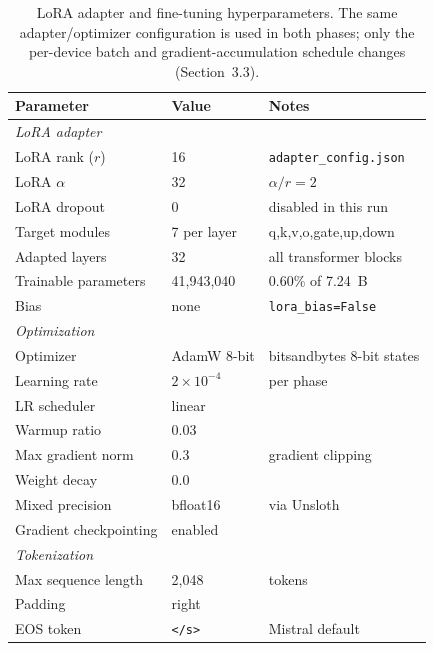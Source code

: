 \documentclass[11pt, a4paper]{article}
\begin{document}
\begin{table}[H]
\centering
\caption{LoRA adapter and fine-tuning hyperparameters. The same adapter/optimizer configuration is used in both phases; only the per-device batch and gradient-accumulation schedule changes (Section~3.3).}
\label{tab:lora-config}
\begin{tabular}{lll}
\hline
\textbf{Parameter} & \textbf{Value} & \textbf{Notes} \\
\hline
\multicolumn{3}{l}{\emph{LoRA adapter}} \\
LoRA rank ($r$)                      & 16     & \texttt{adapter\_config.json} \\
LoRA $\alpha$                        & 32     & $\alpha / r = 2$ \\
LoRA dropout                         & 0      & disabled in this run \\
Target modules                       & 7 per layer & q,k,v,o,gate,up,down \\
Adapted layers                       & 32     & all transformer blocks \\
Trainable parameters                 & 41{,}943{,}040 & 0.60\% of 7.24~B \\
Bias                                 & none   & \texttt{lora\_bias=False} \\
\multicolumn{3}{l}{\emph{Optimization}} \\
Optimizer                            & AdamW 8-bit & bitsandbytes 8-bit states \\
Learning rate                        & $2 \times 10^{-4}$ & per phase \\
LR scheduler                         & linear & \\
Warmup ratio                         & 0.03   & \\
Max gradient norm                    & 0.3    & gradient clipping \\
Weight decay                         & 0.0    & \\
Mixed precision                      & bfloat16 & via Unsloth \\
Gradient checkpointing               & enabled & \\
\multicolumn{3}{l}{\emph{Tokenization}} \\
Max sequence length                  & 2{,}048 & tokens \\
Padding                              & right & \\
EOS token                            & \texttt{</s>} & Mistral default \\
\hline
\end{tabular}
\end{table}
\end{document}
